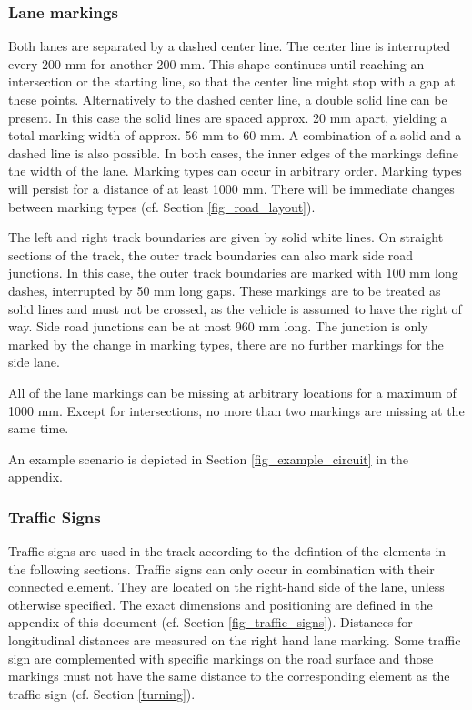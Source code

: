 \subsubsection{Lane markings}
\label{lane_markings}

Both lanes are separated by a dashed center line. The center line is interrupted every 200 mm for another 200 mm. 
This shape continues until reaching an intersection or the starting line, so that the center line might stop with a gap at these points.
Alternatively to the dashed center line, a double solid line can be present.
In this case the solid lines are spaced approx. 20 mm apart, yielding a total marking width of approx. 56 mm to 60 mm.
A combination of a solid and a dashed line is also possible.
In both cases, the inner edges of the markings define the width of the lane.
Marking types can occur in arbitrary order.
Marking types will persist for a distance of at least 1000 mm.
There will be immediate changes between marking types (cf. Section \ref{fig_road_layout}).

The left and right track boundaries are given by solid white lines.
On straight sections of the track, the outer track boundaries can also mark side road junctions.
In this case, the outer track boundaries are marked with 100 mm long dashes, interrupted by 50 mm long gaps.
These markings are to be treated as solid lines and must not be crossed, as the vehicle is assumed to have the right of way.
Side road junctions can be at most 960 mm long.
The junction is only marked by the change in marking types, there are no further markings for the side lane.

All of the lane markings can be missing at arbitrary locations for a maximum of 1000 mm.
Except for intersections, no more than two markings are missing at the same time.

An example scenario is depicted in Section \ref{fig_example_circuit} in the appendix.


\subsubsection{Traffic Signs}
\label{traffic_signs}

Traffic signs are used in the track according to the defintion of the elements in the following sections. 
Traffic signs can only occur in combination with their connected element.
They are located on the right-hand side of the lane, unless otherwise specified. 
The exact dimensions and positioning are defined in the appendix of this document (cf. Section \ref{fig_traffic_signs}).
Distances for longitudinal distances are measured on the right hand lane marking.
Some traffic sign are complemented with specific markings on the road surface and those markings must not have the same distance to the corresponding element as the traffic sign (cf. Section \ref{turning}). 

